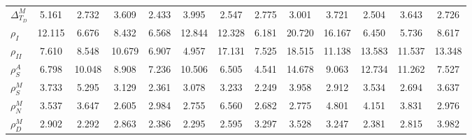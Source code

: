 \begin{center}
\begin{longtable}{lcccccccccccc}
$ {\Delta^{M}_{T_D}}   $	 & 	       5.161	 & 	       2.732	 & 	       3.609	 & 	       2.433	 & 	       3.995	 & 	       2.547	 & 	       2.775	 & 	       3.001	 & 	       3.721	 & 	       2.504	 & 	       3.643	 & 	       2.726 \\ 
$ {\rho_{I}}           $	 & 	      12.115	 & 	       6.676	 & 	       8.432	 & 	       6.568	 & 	      12.844	 & 	      12.328	 & 	       6.181	 & 	      20.720	 & 	      16.167	 & 	       6.450	 & 	       5.736	 & 	       8.617 \\ 
$ {\rho_{II}}          $	 & 	       7.610	 & 	       8.548	 & 	      10.679	 & 	       6.907	 & 	       4.957	 & 	      17.131	 & 	       7.525	 & 	      18.515	 & 	      11.138	 & 	      13.583	 & 	      11.537	 & 	      13.348 \\ 
$ {\rho^{A}_{S}}       $	 & 	       6.798	 & 	      10.048	 & 	       8.908	 & 	       7.236	 & 	      10.506	 & 	       6.505	 & 	       4.541	 & 	      14.678	 & 	       9.063	 & 	      12.734	 & 	      11.262	 & 	       7.527 \\ 
$ {\rho^{M}_{S}}       $	 & 	       3.733	 & 	       5.295	 & 	       3.129	 & 	       2.361	 & 	       3.078	 & 	       3.233	 & 	       2.249	 & 	       3.958	 & 	       2.912	 & 	       3.534	 & 	       2.694	 & 	       3.637 \\ 
$ {\rho^{M}_{N}}       $	 & 	       3.537	 & 	       3.647	 & 	       2.605	 & 	       2.984	 & 	       2.755	 & 	       6.560	 & 	       2.682	 & 	       2.775	 & 	       4.801	 & 	       4.151	 & 	       3.831	 & 	       2.976 \\ 
$ {\rho^{M}_{D}}       $	 & 	       2.902	 & 	       2.292	 & 	       2.863	 & 	       2.386	 & 	       2.295	 & 	       2.595	 & 	       3.297	 & 	       3.528	 & 	       3.247	 & 	       2.381	 & 	       2.815	 & 	       3.982 \\ 
\end{longtable}
 \end{center}
